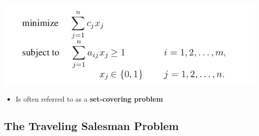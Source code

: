 \documentclass[11pt]{article}
\begin{document}
\begin{center}
\includegraphics[width=.9\linewidth]{Integer Programming/screenshot_2019-02-17_09-28-48.png}
\end{center}
\begin{itemize}
\item Is often referred to as a \textbf{set-covering problem}
\end{itemize}

\subsection{The Traveling Salesman Problem}
\label{sec:orgd998bbf}
\end{document}
